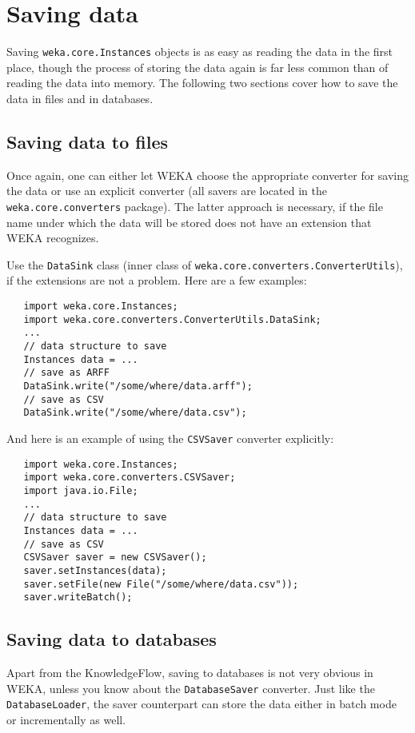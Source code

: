 \newpage

\section{Saving data}
Saving \texttt{weka.core.Instances} objects is as easy as reading the data in
the first place, though the process of storing the data again is far less common
than of reading the data into memory. The following two sections cover how to
save the data in files and in databases.

\subsection{Saving data to files}
Once again, one can either let WEKA choose the appropriate converter for saving
the data or use an explicit converter (all savers are located in the
\texttt{weka.core.converters} package). The latter approach is necessary, if the
file name under which the data will be stored does not have an extension that
WEKA recognizes.

Use the \texttt{DataSink} class (inner class of
\texttt{weka.core.converters.ConverterUtils}), if the extensions are not a
problem. Here are a few examples:
\begin{verbatim}
   import weka.core.Instances;
   import weka.core.converters.ConverterUtils.DataSink;
   ...
   // data structure to save
   Instances data = ...
   // save as ARFF
   DataSink.write("/some/where/data.arff");
   // save as CSV
   DataSink.write("/some/where/data.csv");
\end{verbatim}
And here is an example of using the \texttt{CSVSaver} converter explicitly:
\begin{verbatim}
   import weka.core.Instances;
   import weka.core.converters.CSVSaver;
   import java.io.File;
   ...
   // data structure to save
   Instances data = ...
   // save as CSV
   CSVSaver saver = new CSVSaver();
   saver.setInstances(data);
   saver.setFile(new File("/some/where/data.csv"));
   saver.writeBatch();
\end{verbatim}

\subsection{Saving data to databases}
Apart from the KnowledgeFlow, saving to databases is not very obvious in WEKA,
unless you know about the \texttt{DatabaseSaver} converter. Just like the
\texttt{DatabaseLoader}, the saver counterpart can store the data either in
batch mode or incrementally as well.

